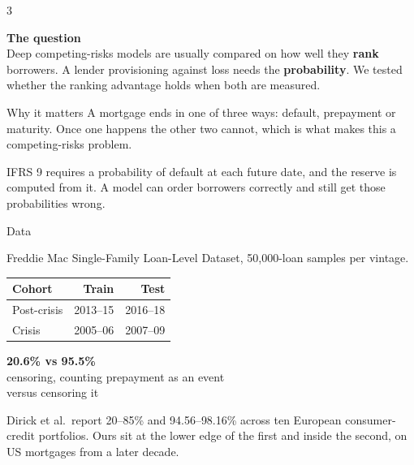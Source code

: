 \documentclass[final]{article}
\newcommand{\bignum}[2]{{\fontsize{64}{72}\selectfont\bfseries\color{accent}#1}\\[1mm]{\fontsize{32}{39}\selectfont #2}}
\begin{document}
\begin{multicols}{3}

\begin{hilite}
{\fontsize{46}{55}\selectfont\bfseries\color{su} The question}\\[4mm]
Deep competing-risks models are usually compared on how well they
\textbf{rank} borrowers. A lender provisioning against loss needs the
\textbf{probability}. We tested whether the ranking advantage holds when both
are measured.
\end{hilite}

\begin{panel}{Why it matters}
A mortgage ends in one of three ways: default, prepayment or maturity. Once
one happens the other two cannot, which is what makes this a competing-risks
problem.

\vspace{4mm}
IFRS 9 requires a probability of default at each future date, and the reserve is
computed from it. A model can order borrowers correctly and still get those
probabilities wrong.
\end{panel}

\begin{panel}{Data}
{\raggedright Freddie Mac Single-Family Loan-Level Dataset, 50{,}000-loan
samples per vintage.\par}

\vspace{4mm}
\begin{tabular}{@{}lrr@{}}
\toprule
Cohort & Train & Test \\
\midrule
Post-crisis & 2013--15 & 2016--18 \\
Crisis & 2005--06 & 2007--09 \\
\bottomrule
\end{tabular}

\vspace{5mm}
\begin{center}
\bignum{20.6\% vs 95.5\%}{censoring, counting prepayment as an event\\versus censoring it}
\end{center}

\vspace{3mm}
Dirick et al.\ report 20--85\% and 94.56--98.16\% across ten European
consumer-credit portfolios. Ours sit at the lower edge of the first and inside
the second, on US mortgages from a later decade.
\end{panel}


\end{multicols}
\end{document}

